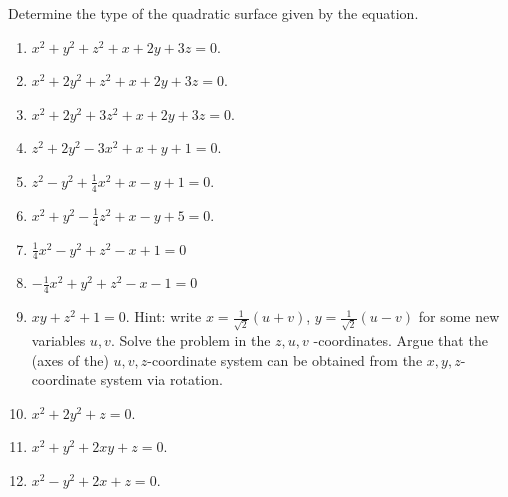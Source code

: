 Determine the type of the quadratic surface given by the equation.
\begin{enumerate}
\item 
$x^2 +y^2+z^2+x+2y+3z=0$.
\item $x^2 +2y^2+z^2+x+2y+3z=0$.
\item $x^2 +2y^2+3z^2+x+2y+3z=0$.
\item $z^2+2y^2-3x^2 + x+y+1=0 $.
\item $z^2-y^2+\frac{1}{4}x^2 + x-y+1=0 $.
\item $x^2+y^2-\frac{1}{4}z^2 + x-y+5=0 $.
\item $\frac{1}{4}x^2-y^2+z^2-x+1=0$
\item $-\frac{1}{4}x^2+y^2+z^2-x-1=0$
\item $xy +z^2+1=0$. Hint: write $x=\frac{1}{\sqrt{2}}(u+v)$, $y=\frac{1}{ \sqrt{ 2} } (u-v) $ for some new variables $u,v$. Solve the problem in the $z,u,v$ -coordinates. Argue that the (axes of the) $u,v,z$-coordinate system can be obtained from the $x,y,z$-coordinate system via rotation.
\item $x^2+2y^2+z=0 $.
\item $x^2+y^2+2xy+z=0 $.
\item $x^2-y^2+2x+z=0 $.
\end{enumerate}